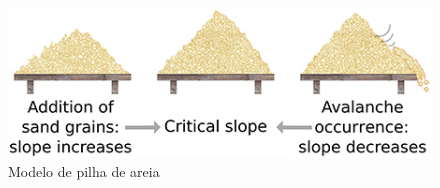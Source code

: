 \begin{figure}[htb!]
	\centering
	\caption{Modelo de pilha de areia}
	\label{fig:sandpile}
	\includegraphics[width=0.7\linewidth]{figs/sandpile}
\end{figure}



